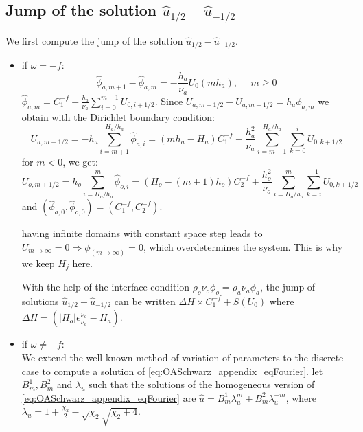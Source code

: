 \begin{subappendices}
\subsection{Jump of the solution
	$\widehat{u}_{1/2} - \widehat{u}_{-1/2}$}
We first compute the jump of the solution
$\widehat{u}_{1/2} - \widehat{u}_{-1/2}$.
\begin{itemize}
\item if $\omega=-f$:
	\begin{equation}
		\widehat{\phi}_{a, m+1} - \widehat{\phi}_{a,m} =
		-\frac{h_a}{\nu_a} U_0(m h_a), ~~~~~~ m \geq 0
	\end{equation}
		$\widehat{\phi}_{a,m}= {C}_1^{-f} - \frac{h_a}{\nu_a}
	\sum_{i=0}^{m-1} U_{0, i+1/2}$.
	Since $U_{a, m+1/2}- U_{a, m-1/2} =
	h_a \phi_{a, m}$ we obtain with the Dirichlet
	boundary condition:
	\begin{equation}
		U_{a,m+1/2} = -h_a\sum_{i=m+1}^{H_a/h_a}
		\widehat{\phi}_{a,i} =(m h_a - H_a){C}_1^{-f}+
		\frac{h_a^2}{\nu_a}\sum_{i=m+1}^{H_a/h_a}
		\sum_{k=0}^{i}U_{0,k+1/2}
	\end{equation}
	for $m<0$, we get:
	\begin{equation}
		U_{o,m+1/2} = h_o\sum_{i=H_o/h_o}^{m}
		\widehat{\phi}_{o,i} =(H_o - (m+1) h_o){C}_2^{-f}+
		\frac{h_o^2}{\nu_o}\sum_{i=H_o/h_o}^{m}
		\sum_{k=i}^{-1}U_{0,k+1/2}
	\end{equation}
	and $(\widehat{\phi}_{a,0}, \widehat{\phi}_{o,0}) =
		({C}_1^{-f},{C}_2^{-f})$.
	\begin{remark}
		having infinite domains with constant space step
		leads to $U_{m\rightarrow \infty}=0 \Rightarrow
		\phi_{(m\rightarrow \infty)}=0$, which overdetermines
		the system. This is why we keep $H_j$ here.
	\end{remark}
	With the help of the interface condition
	$\rho_o \nu_o \phi_o = \rho_a \nu_a \phi_a$,
	the jump of solutions
	$\widehat{u}_{1/2} - \widehat{u}_{-1/2}$ can be written
		$ \Delta H \times {C}_1^{-f} +S(U_0)$ where
	$\Delta H = (|H_o|\epsilon \frac{\nu_o}{\nu_a} - H_a)$.
\item if $\omega \neq -f$: \\
We extend the well-known method of variation of parameters to the
discrete case to compute a solution of
\eqref{eq:OASchwarz_appendix_eqFourier}.
	let $B_m^1, B_m^2$ and $\lambda_u$ such that
	the solutions of the homogeneous version of
	\eqref{eq:OASchwarz_appendix_eqFourier} are
		$\widehat{u} = B^1_m \lambda_u^m +
			B^2_m \lambda_u^{-m}$, where
	$\lambda_u=1+\frac{\chi_2}{2} -\sqrt{\chi_2}\sqrt{\chi_2+4}$.

\end{itemize}
\end{subappendices}
